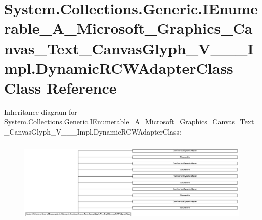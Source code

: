 \hypertarget{class_system_1_1_collections_1_1_generic_1_1_i_enumerable___a___microsoft___graphics___canvas___8a242bd86cab7f1c29f862df50245d76}{}\section{System.\+Collections.\+Generic.\+I\+Enumerable\+\_\+\+A\+\_\+\+Microsoft\+\_\+\+Graphics\+\_\+\+Canvas\+\_\+\+Text\+\_\+\+Canvas\+Glyph\+\_\+\+V\+\_\+\+\_\+\+\_\+\+Impl.\+Dynamic\+R\+C\+W\+Adapter\+Class Class Reference}
\label{class_system_1_1_collections_1_1_generic_1_1_i_enumerable___a___microsoft___graphics___canvas___8a242bd86cab7f1c29f862df50245d76}
Inheritance diagram for System.\+Collections.\+Generic.\+I\+Enumerable\+\_\+\+A\+\_\+\+Microsoft\+\_\+\+Graphics\+\_\+\+Canvas\+\_\+\+Text\+\_\+\+Canvas\+Glyph\+\_\+\+V\+\_\+\+\_\+\+\_\+\+Impl.\+Dynamic\+R\+C\+W\+Adapter\+Class\+:\begin{figure}[H]
\begin{center}
\leavevmode
\includegraphics[height=4.041995cm]{class_system_1_1_collections_1_1_generic_1_1_i_enumerable___a___microsoft___graphics___canvas___8a242bd86cab7f1c29f862df50245d76}
\end{center}
\end{figure}
